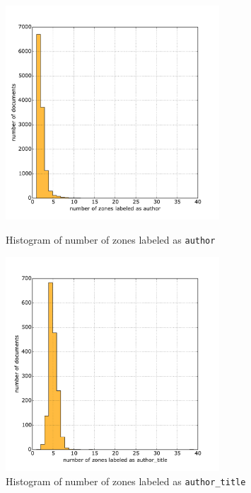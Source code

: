 \begin{figure}
\centering
\begin{minipage}[t!]{0.48\linewidth}
  \includegraphics[width=8cm]{plots/author_histogram}
  \caption{Histogram of number of zones labeled as \texttt{author}}
  \label{fig:author_histogram}
\end{minipage}
\quad
\begin{minipage}[t!]{0.48\linewidth}
  \includegraphics[width=8cm]{plots/author_title_histogram}
  \caption{Histogram of number of zones labeled as \texttt{author\_title}}
  \label{fig:author_title_histogram}
\end{minipage}
\end{figure}

